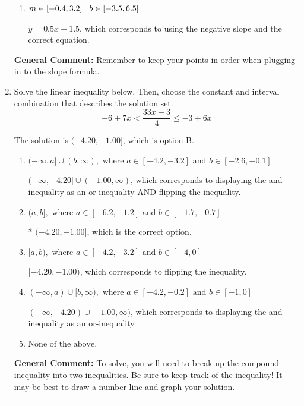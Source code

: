 \documentclass{extbook}[14pt]
\newcommand{\litem}[1]{\item #1

\rule{\textwidth}{0.4pt}}
\begin{document}
\begin{enumerate}
{\begin{enumerate}[label=\Alph*.]
* $y = -0.5x + 7.5$, which is the correct option.
\item \( m \in [-0.4, 3.2] \hspace*{3mm} b \in [-3.5, 6.5] \)

 $y = 0.5x -1.5$, which corresponds to using the negative slope and the correct equation.
\end{enumerate}

\textbf{General Comment:} Remember to keep your points in order when plugging in to the slope formula.
}
\litem{
Solve the linear inequality below. Then, choose the constant and interval combination that describes the solution set.
\[ -6 + 7 x < \frac{33 x - 3}{4} \leq -3 + 6 x \]

The solution is \( (-4.20, -1.00] \), which is option B.\begin{enumerate}[label=\Alph*.]
\item \( (-\infty, a] \cup (b, \infty), \text{ where } a \in [-4.2, -3.2] \text{ and } b \in [-2.6, -0.1] \)

$(-\infty, -4.20] \cup (-1.00, \infty)$, which corresponds to displaying the and-inequality as an or-inequality AND flipping the inequality.
\item \( (a, b], \text{ where } a \in [-6.2, -1.2] \text{ and } b \in [-1.7, -0.7] \)

* $(-4.20, -1.00]$, which is the correct option.
\item \( [a, b), \text{ where } a \in [-4.2, -3.2] \text{ and } b \in [-4, 0] \)

$[-4.20, -1.00)$, which corresponds to flipping the inequality.
\item \( (-\infty, a) \cup [b, \infty), \text{ where } a \in [-4.2, -0.2] \text{ and } b \in [-1, 0] \)

$(-\infty, -4.20) \cup [-1.00, \infty)$, which corresponds to displaying the and-inequality as an or-inequality.
\item \( \text{None of the above.} \)


\end{enumerate}

\textbf{General Comment:} To solve, you will need to break up the compound inequality into two inequalities. Be sure to keep track of the inequality! It may be best to draw a number line and graph your solution.
}
\end{enumerate}
\end{document}
